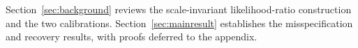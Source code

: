 Section~\ref{sec:background} reviews the scale-invariant likelihood-ratio
construction and the two calibrations. Section~\ref{sec:mainresult}
establishes the misspecification and recovery results, with proofs
deferred to the appendix.
%
%
%
%
%
%
%
%
%
%
